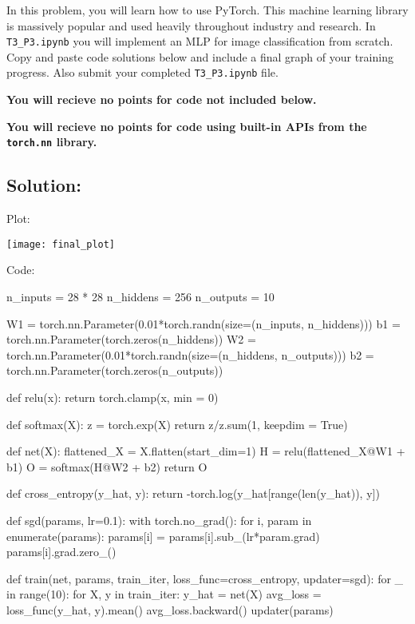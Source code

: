 \documentclass[submit]{harvardml}
\begin{document}
\newpage

\begin{problem}
  In this problem, you will learn how to use PyTorch. This machine learning library is massively popular and used heavily throughout industry and research. In \verb|T3_P3.ipynb| you will implement an MLP for image classification from scratch. Copy and paste code solutions below and include a final graph of your training progress. Also submit your completed \verb|T3_P3.ipynb| file.

  {\bfseries You will recieve no points for code not included below.}

  {\bfseries You will recieve no points for code using built-in APIs from the \verb|torch.nn| library.}
  
\end{problem}


\subsection*{Solution:}
Plot:

\texttt{[image: final\_plot]}

Code:

\begin{python}
n_inputs = 28 * 28
n_hiddens = 256
n_outputs = 10

W1 = torch.nn.Parameter(0.01*torch.randn(size=(n_inputs, n_hiddens)))
b1 = torch.nn.Parameter(torch.zeros(n_hiddens))
W2 = torch.nn.Parameter(0.01*torch.randn(size=(n_hiddens, n_outputs)))
b2 = torch.nn.Parameter(torch.zeros(n_outputs))



def relu(x):
    return torch.clamp(x, min = 0)



def softmax(X):
    z = torch.exp(X)
    return z/z.sum(1, keepdim = True)



def net(X):
  flattened_X = X.flatten(start_dim=1)
  H = relu(flattened_X@W1 + b1)
  O = softmax(H@W2 + b2)
  return O



def cross_entropy(y_hat, y):
  return -torch.log(y_hat[range(len(y_hat)), y])



def sgd(params, lr=0.1):
  with torch.no_grad():
        for i, param in enumerate(params):
            params[i] = params[i].sub_(lr*param.grad)
            params[i].grad.zero_()



def train(net, params, train_iter, loss_func=cross_entropy, updater=sgd):
  for _ in range(10):
        for X, y in train_iter:
            y_hat = net(X)
            avg_loss = loss_func(y_hat, y).mean()
            avg_loss.backward()
            updater(params)

\end{python}
\end{document}
